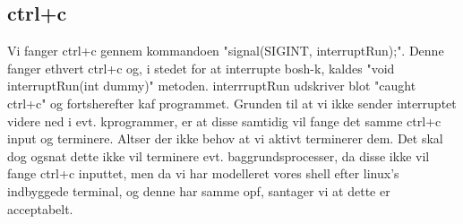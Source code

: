 \subsection{ctrl+c}
Vi fanger ctrl+c gennem kommandoen "signal(SIGINT, interruptRun);". Denne fanger ethvert ctrl+c og, i stedet for at interrupte bosh-k, kaldes "void interruptRun(int dummy)" metoden. interrruptRun udskriver blot "caught ctrl+c" og forts herefter k af programmet. Grunden til at vi ikke sender interruptet videre ned i evt. k programmer, er at disse samtidig vil fange det samme ctrl+c input og terminere. Alts\å er der ikke behov at vi aktivt terminerer dem. Det skal dog ogs\å n at dette ikke vil terminere evt. baggrundsprocesser, da disse ikke vil fange ctrl+c inputtet, men da vi har modelleret vores shell efter linux's indbyggede terminal, og denne har samme opf, s\å antager vi at dette er acceptabelt. 

